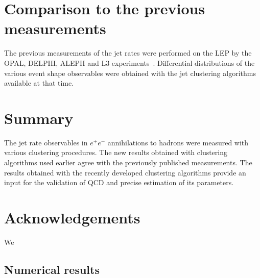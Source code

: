 \section{Comparison to the previous measurements}                      
\label{sec:comparison}
The previous measurements of the jet rates were performed on the LEP by 
the OPAL, DELPHI, ALEPH and L3 experiments~\cite{Alexander:1996kh,
Ackerstaff:1997kk,Acton:1992fa,Akrawy:1989rg,Heister:2003aj,Abdallah:2003xz,Achard:2004sv}.
Differential distributions of the various event shape observables were 
obtained with the jet clustering algorithms available at that  time.
\section{Summary}                      
\label{sec:summary}
The jet rate observables  in $e^+e^-$ 
annihilations to hadrons were measured with various clustering procedures.
The new results obtained with 
clustering algorithms  used earlier agree with the previously published measurements.
The results obtained with the recently developed clustering algorithms  
provide an input for the validation of QCD and precise estimation of its parameters.
%
\section*{Acknowledgements}
\label{sec:acknowledgements}
We
\FloatBarrier
\begin{appendices}
\section{Numerical results}
\label{sec:appendixA}


\renewcommand{\TABGFONTSIZE}{\scriptsize}
\newarray\TABGCAPTIONcorrected
{}
\newarray\TABGCAPTIONolddata
{}



\end{appendices}
